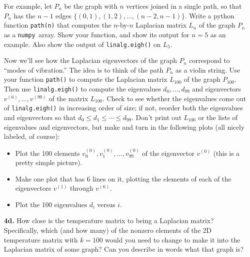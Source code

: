 \documentclass[11pt]{article}
\newcommand{\numpy}{{\tt numpy}}            %
\begin{document}
For example, let $P_n$ be the graph with $n$ vertices joined in a single path, 
so that $P_n$ has the $n-1$ edges $\{(0,1), (1,2), \ldots, (n-2, n-1)\}$.
Write a python function {\tt path(n)} that computes the $n$-by-$n$ Laplacian matrix
$L_n$ of the graph $P_n$ as a \numpy\ array.
Show your function, and show its output for $n=5$ as an example.
Also show the output of {\tt linalg.eigh()} on $L_5$.

Now we'll see how the Laplacian eigenvectors of the graph $P_n$ correspond 
to ``modes of vibration.'' 
The idea is to think of the path $P_n$ as a violin string.
Use your function {\tt path()} to compute the Laplacian matrix $L_{100}$ of 
the graph $P_{100}$. 
Then use {\tt linalg.eigh()} to compute the eigenvalues $d_0,\ldots,d_{99}$
and eigenvectors $v^{(0)},\ldots,v^{(99)}$ of the matrix $L_{100}$.
Check to see whether the eigenvalues come out of {\tt linalg.eigh()} in
increasing order of size; 
if not, reorder both the eigenvalues and eigenvectors so that
$d_0 \le d_1 \le \cdots \le d_{99}$.
Don't print out $L_{100}$ or the lists of eigenvalues and eigenvectors, 
but make and turn in the following plots (all nicely labeled, of course):
\begin{itemize}
\item Plot the 100 elements $v^{(0)}_0, v^{(0)}_1, \ldots, v^{(0)}_{99}$
      of the eigenvector $v^{(0)}$ (this is a pretty simple picture).
\item Make one plot that has 6 lines on it, plotting the elements of 
      each of the eigenvectors $v^{(1)}$ through $v^{(6)}$.
\item Plot the 100 eigenvalues $d_i$ versus $i$.
\end{itemize}

\par\medskip
{\bf 4d.} 
How close is the temperature matrix to being a Laplacian matrix?
Specifically, which (and how many) of the nonzero elements of the 
2D temperature matrix with $k=100$ would you need to change to make 
it into the Laplacian matrix of some graph? 
Can you describe in words what that graph is?
\end{document}
